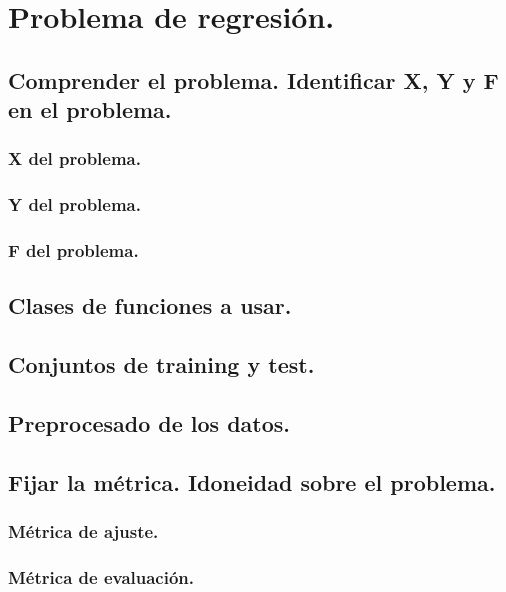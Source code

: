 \documentclass[12pt, spanish]{article}
\begin{document}
\newpage

\section{Problema de regresión.}

\subsection{Comprender el problema. Identificar X, Y y F en el problema.}


\subsubsection{X del problema.}


\subsubsection{Y del problema.}

\subsubsection{F del problema.}

\subsection{Clases de funciones a usar.}

\subsection{Conjuntos de training y test.}

\subsection{Preprocesado de los datos.}

\subsection{Fijar la métrica. Idoneidad sobre el problema.}

\subsubsection{Métrica de ajuste.}

\subsubsection{Métrica de evaluación.}
\end{document}
